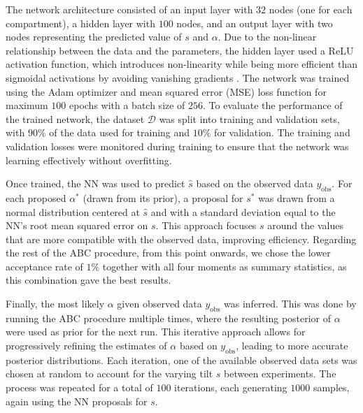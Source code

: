 \documentclass[a4paper, 12pt]{article}
\begin{document}
The network architecture consisted of an input layer with $32$ nodes (one for each compartment), a hidden layer with $100$ nodes, and an output layer with two nodes representing the predicted value of $s$ and $\alpha$. Due to the non-linear relationship between the data and the parameters, the hidden layer used a ReLU activation function, which introduces non-linearity while being more efficient than sigmoidal activations by avoiding vanishing gradients \cite{nwankpa2018activationfunctionscomparisontrends}. The network was trained using the Adam optimizer and mean squared error (MSE) loss function for maximum $100$ epochs with a batch size of $256$. To evaluate the performance of the trained network, the dataset $\mathcal{D}$ was split into training and validation sets, with $90\%$ of the data used for training and $10\%$ for validation. The training and validation losses were monitored during training to ensure that the network was learning effectively without overfitting.

Once trained, the NN was used to predict $\hat{s}$ based on the observed data $y_{\text{obs}}$. For each proposed $\alpha^\ast$ (drawn from its prior), a proposal for $s^\ast$ was drawn from a normal distribution centered at $\hat{s}$ and with a standard deviation equal to the NN's root mean squared error on $s$. This approach focuses $s$ around the values that are more compatible with the observed data, improving efficiency. Regarding the rest of the ABC procedure, from this point onwards, we chose the lower acceptance rate of $1\%$ together with all four moments as summary statistics, as this combination gave the best results.

Finally, the most likely $\alpha$ given observed data $y_\text{obs}$ was inferred. This was done by running the ABC procedure multiple times, where the resulting posterior of $\alpha$ were used as prior for the next run. This iterative approach allows for progressively refining the estimates of $\alpha$ based on $y_\text{obs}$, leading to more accurate posterior distributions. Each iteration, one of the available observed data sets was chosen at random to account for the varying tilt $s$ between experiments. The process was repeated for a total of $100$ iterations, each generating $1000$ samples, again using the NN proposals for $s$.
\end{document}
